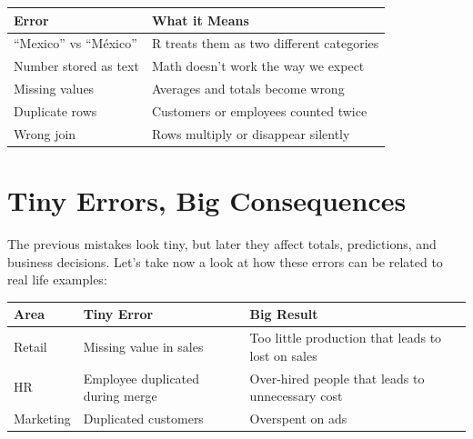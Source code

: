 \documentclass[
  stu,
  floatsintext,
  longtable,
  a4paper,
  nolmodern,
  notxfonts,
  notimes,
  colorlinks=true,linkcolor=blue,citecolor=blue,urlcolor=blue]{apa7}
\begin{document}
\begin{table}

{\caption{{What may be considered as ``small error''
examples}{\label{tbl-atable}}}}

\begin{longtable}[]{@{}ll@{}}
\toprule\noalign{}
Error & What it Means \\
\midrule\noalign{}
\endhead
\bottomrule\noalign{}
\endlastfoot
``Mexico'' vs ``México'' & R treats them as two different categories \\
Number stored as text & Math doesn't work the way we expect \\
Missing values & Averages and totals become wrong \\
Duplicate rows & Customers or employees counted twice \\
Wrong join & Rows multiply or disappear silently \\
\end{longtable}

\end{table}

\section{Tiny Errors, Big
Consequences}\label{tiny-errors-big-consequences}

The previous mistakes look tiny, but later they affect totals,
predictions, and business decisions. Let's take now a look at how these
errors can be related to real life examples:

\begin{table}

{\caption{{Examples in real life}{\label{tbl-btable}}}}

\begin{longtable}[]{@{}
  >{\raggedright\arraybackslash}p{}
  >{\raggedright\arraybackslash}p{}
  >{\raggedright\arraybackslash}p{}@{}}
\toprule\noalign{}
\begin{minipage}[b]{\linewidth}\raggedright
Area
\end{minipage} & \begin{minipage}[b]{\linewidth}\raggedright
Tiny Error
\end{minipage} & \begin{minipage}[b]{\linewidth}\raggedright
Big Result
\end{minipage} \\
\midrule\noalign{}
\endhead
\bottomrule\noalign{}
\endlastfoot
Retail & Missing value in sales & Too little production that leads to
lost on sales \\
HR & Employee duplicated during merge & Over-hired people that leads to
unnecessary cost \\
Marketing & Duplicated customers & Overspent on ads \\
\end{longtable}

\end{table}
\end{document}
